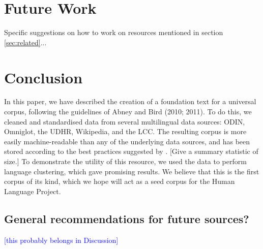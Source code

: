 
\section{Future Work} \label{sec:future}

Specific suggestions on how to work on resources mentioned in section \ref{sec:related}...


\section{Conclusion} \label{sec:conclusion}

In this paper, we have described the creation of a foundation text for a universal corpus, following the guidelines of Abney and Bird (2010; 2011). To do this, we cleaned and standardised data from several multilingual data sources: ODIN, Omniglot, the UDHR, Wikipedia, and the LCC. The resulting corpus is more easily machine-readable than any of the underlying data sources, and has been stored according to the best practices suggested by . [Give a summary statistic of size.] To demonstrate the utility of this resource, we used the data to perform language clustering, which gave promising results. We believe that this is the first corpus of its kind, which we hope will act as a seed corpus for the Human Language Project.



\subsection{General recommendations for future sources?}

\textcolor{blue}{[this probably belongs in Discussion]}
